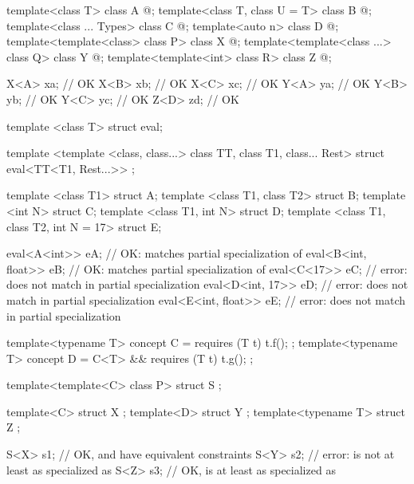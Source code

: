 \begin{example}
\begin{codeblock}
template<class T> class A { @\commentellip@ };
template<class T, class U = T> class B { @\commentellip@ };
template<class ... Types> class C { @\commentellip@ };
template<auto n> class D { @\commentellip@ };
template<template<class> class P> class X { @\commentellip@ };
template<template<class ...> class Q> class Y { @\commentellip@ };
template<template<int> class R> class Z { @\commentellip@ };

X<A> xa;            // OK
X<B> xb;            // OK
X<C> xc;            // OK
Y<A> ya;            // OK
Y<B> yb;            // OK
Y<C> yc;            // OK
Z<D> zd;            // OK
\end{codeblock}
\end{example}
\begin{example}
\begin{codeblock}
template <class T> struct eval;

template <template <class, class...> class TT, class T1, class... Rest>
struct eval<TT<T1, Rest...>> { };

template <class T1> struct A;
template <class T1, class T2> struct B;
template <int N> struct C;
template <class T1, int N> struct D;
template <class T1, class T2, int N = 17> struct E;

eval<A<int>> eA;                // OK: matches partial specialization of 
eval<B<int, float>> eB;         // OK: matches partial specialization of 
eval<C<17>> eC;                 // error:  does not match  in partial specialization
eval<D<int, 17>> eD;            // error:  does not match  in partial specialization
eval<E<int, float>> eE;         // error:  does not match  in partial specialization
\end{codeblock}
\end{example}
\begin{example}
\begin{codeblock}
template<typename T> concept C = requires (T t) { t.f(); };
template<typename T> concept D = C<T> && requires (T t) { t.g(); };

template<template<C> class P> struct S { };

template<C> struct X { };
template<D> struct Y { };
template<typename T> struct Z { };

S<X> s1;            // OK,  and  have equivalent constraints
S<Y> s2;            // error:  is not at least as specialized as 
S<Z> s3;            // OK,  is at least as specialized as 
\end{codeblock}
\end{example}

